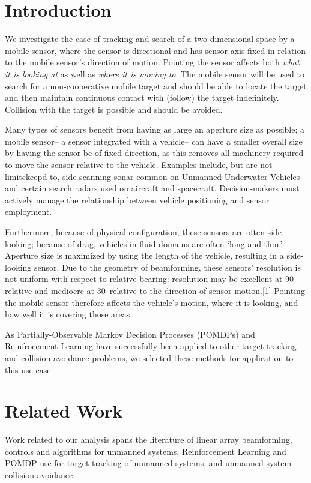\documentclass{article}
\begin{document}
\section{Introduction}
\par We investigate the case of tracking and search of a two-dimensional space by a mobile sensor, where the sensor is directional and has sensor axis fixed in relation to the mobile sensor's direction of motion. Pointing the sensor affects both \textit{what it is looking at} as well as \textit{where it is moving to}. The mobile sensor will be used to search for a non-cooperative mobile target and should be able to locate the target and then maintain continuous contact with (follow) the target indefinitely. Collision with the target is possible and should be avoided.
\par Many types of sensors benefit from having as large an aperture size as possible; a mobile sensor-- a sensor integrated with a vehicle-- can have a smaller overall size by having the sensor be of fixed direction, as this removes all machinery required to move the sensor relative to the vehicle. Examples include, but are not limitekeepd to, side-scanning sonar common on Unmanned Underwater Vehicles and certain search radars used on aircraft and spacecraft. Decision-makers must actively manage the relationship between vehicle positioning and sensor employment.
\par Furthermore, because of physical configuration, these sensors are often side-looking; because of drag, vehicles in fluid domains are often `long and thin.' Aperture size is maximized by using the length of the vehicle, resulting in a side-looking sensor. Due to the geometry of beamforming, these sensors' resolution is not uniform with respect to relative bearing: resolution may be excellent at 90\textdegree \, relative and mediocre at 30\textdegree \, relative to the direction of sensor motion.[1] Pointing the mobile sensor therefore affects the vehicle's motion, where it is looking, and how well it is covering those areas.
\par As Partially-Observable Markov Decision Processes (POMDPs) and Reinfrocement Learning have successfully been applied to other target tracking and collision-avoidance problems, we selected these methods for application to this use case.


\section{Related Work}
\par Work related to our analysis spans the literature of linear array beamforming, controls and algorithms for unmanned systems, Reinforcement Learning and POMDP use for target tracking of unmanned systems, and unmanned system collision avoidance.
\end{document}
